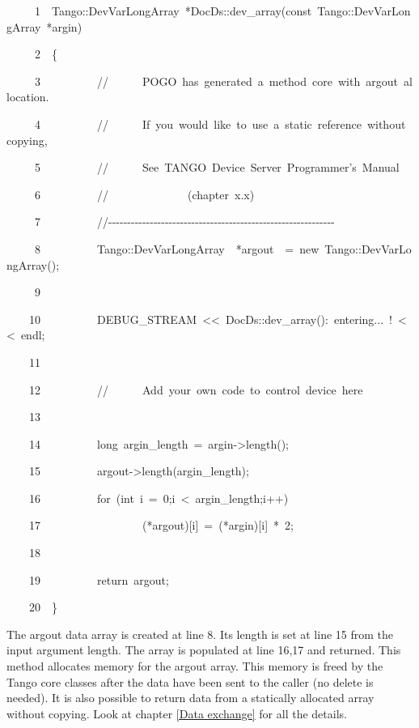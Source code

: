 
\begin{lyxcode}
~~~~~1~~Tango::DevVarLongArray~{*}DocDs::dev\_array(const~Tango::DevVarLongArray~{*}argin)

~~~~~2~~\{

~~~~~3~~~~~~~~~~//~~~~~~POGO~has~generated~a~method~core~with~argout~allocation.

~~~~~4~~~~~~~~~~//~~~~~~If~you~would~like~to~use~a~static~reference~without~copying,

~~~~~5~~~~~~~~~~//~~~~~~See~\textquotedbl{}TANGO~Device~Server~Programmer's~Manual\textquotedbl{}

~~~~~6~~~~~~~~~~//~~~~~~~~~~~~~~(chapter~x.x)

~~~~~7~~~~~~~~~~//-{}-{}-{}-{}-{}-{}-{}-{}-{}-{}-{}-{}-{}-{}-{}-{}-{}-{}-{}-{}-{}-{}-{}-{}-{}-{}-{}-{}-{}-{}-{}-{}-{}-{}-{}-{}-{}-{}-{}-{}-{}-{}-{}-{}-{}-{}-{}-{}-{}-{}-{}-{}-{}-{}-{}-{}-{}-{}-{}-

~~~~~8~~~~~~~~~~Tango::DevVarLongArray~~{*}argout~~=~new~Tango::DevVarLongArray();

~~~~~9~~~~~~~~~~~~~~~~~~

~~~~10~~~~~~~~~~DEBUG\_STREAM~<\textcompwordmark{}<~\textquotedbl{}DocDs::dev\_array():~entering...~!\textquotedbl{}~<\textcompwordmark{}<~endl;

~~~~11~~

~~~~12~~~~~~~~~~//~~~~~~Add~your~own~code~to~control~device~here

~~~~13~~

~~~~14~~~~~~~~~~long~argin\_length~=~argin->length();~~~~

~~~~15~~~~~~~~~~argout->length(argin\_length);

~~~~16~~~~~~~~~~for~(int~i~=~0;i~<~argin\_length;i++)

~~~~17~~~~~~~~~~~~~~~~~~({*}argout){[}i{]}~=~({*}argin){[}i{]}~{*}~2;

~~~~18~~

~~~~19~~~~~~~~~~return~argout;

~~~~20~~\}
\end{lyxcode}


The argout data array is created at line 8. Its length is set at line
15 from the input argument length. The array is populated at line
16,17 and returned. This method allocates memory for
the argout array. This memory is freed by the Tango core classes after
the data have been sent to the caller (no delete is needed). It is
also possible to return data from a statically allocated array without
copying. Look at chapter \ref{Data exchange} for all the details.


